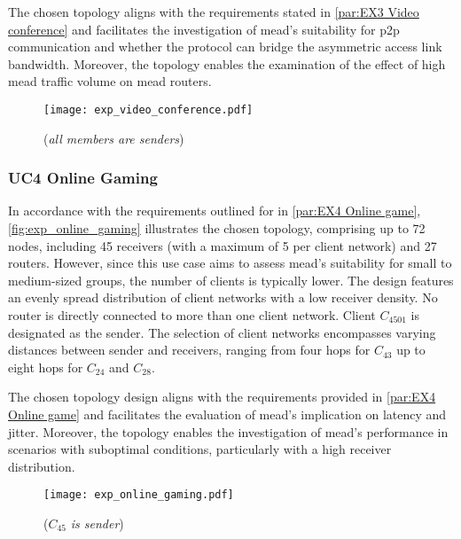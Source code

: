 The chosen topology aligns with the requirements stated in
    \autoref{par:EX3 Video conference} and facilitates the investigation of
    \gls{mead}'s suitability for \gls{p2p} communication and whether the
    protocol can bridge the asymmetric access link bandwidth.
Moreover, the topology enables the examination of the effect of high \gls{mead}
    traffic volume on \gls{mead} routers.

\begin{figure}
    \begin{center}
        \texttt{[image: exp\_video\_conference.pdf]}
    \end{center}
    \caption[UC3: P2P Video Conference]{\nuciii{} (\textit{all members are senders})}
    \label{fig:exp_video_conference}
\end{figure}

\subsubsection{UC4 Online Gaming} %
\label{par:EX4 Online Gaming}
In accordance with the requirements outlined for \uciv{} in
    \autoref{par:EX4 Online game}, \autoref{fig:exp_online_gaming}
    illustrates the chosen topology, comprising up to 72 nodes, including
    45 receivers (with a maximum of 5 per client network) and 27 routers.
However, since this use case aims to assess \gls{mead}'s suitability for small
    to medium-sized groups, the number of clients is typically lower.
The design features an evenly spread distribution of client networks with a low
    receiver density.
No router is directly connected to more than one client network.
Client $C_{4501}$ is designated as the sender.
The selection of client networks encompasses varying distances between sender
    and receivers, ranging from four hops for $C_{43}$ up to eight hops for
    $C_{24}$ and $C_{28}$.

The chosen topology design aligns with the requirements provided in
    \autoref{par:EX4 Online game} and facilitates the evaluation of \gls{mead}'s
    implication on latency and jitter.
Moreover, the topology enables the investigation of \gls{mead}'s performance in
    scenarios with suboptimal conditions, particularly with a high receiver
    distribution.

\begin{figure}
    \begin{center}
        \texttt{[image: exp\_online\_gaming.pdf]}
    \end{center}
    \caption[UC4: Online Gaming]{\nuciv{} ($C_{45}$ \textit{is sender})}
    \label{fig:exp_online_gaming}
\end{figure}


